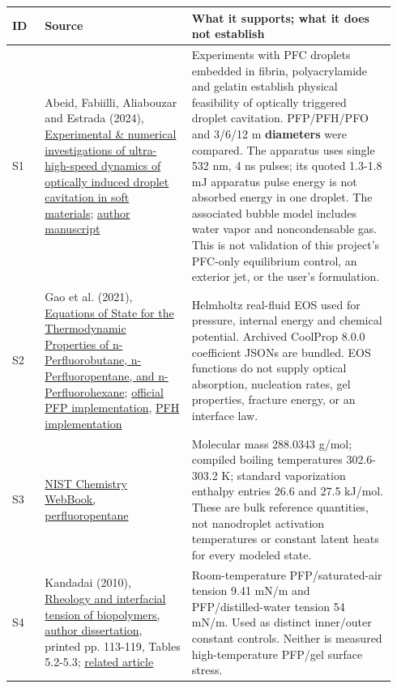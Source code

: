 \documentclass[10pt,a4paper]{article}
\begin{document}
\begin{longtable}{>{\raggedright\arraybackslash}p{0.08\linewidth}>{\raggedright\arraybackslash}p{0.36\linewidth}>{\raggedright\arraybackslash}p{0.5\linewidth}}
\toprule
\textbf{ID} & \textbf{Source} & \textbf{What it supports; what it does not establish}\\\midrule\endhead
S1 & Abeid, Fabiilli, Aliabouzar and Estrada (2024), \href{https://doi.org/10.1016/j.jmbbm.2024.106776}{Experimental \& numerical investigations of ultra-high-speed dynamics of optically induced droplet cavitation in soft materials}; \href{https://pmc.ncbi.nlm.nih.gov/articles/PMC12557251/}{author manuscript} & Experiments with PFC droplets embedded in fibrin, polyacrylamide and gelatin establish physical feasibility of optically triggered droplet cavitation. PFP/PFH/PFO and 3/6/12 \textmu{}m \textbf{diameters} were compared. The apparatus uses single 532 nm, 4 ns pulses; its quoted 1.3-1.8 mJ apparatus pulse energy is not absorbed energy in one droplet. The associated bubble model includes water vapor and noncondensable gas. This is not validation of this project's PFC-only equilibrium control, an exterior jet, or the user's formulation.\\[4pt]
S2 & Gao et al. (2021), \href{https://doi.org/10.1021/acs.iecr.1c02969}{Equations of State for the Thermodynamic Properties of n-Perfluorobutane, n-Perfluoropentane, and n-Perfluorohexane}; \href{https://coolprop.org/fluid_properties/fluids/n-Perfluoropentane.html}{official PFP implementation}, \href{https://coolprop.org/fluid_properties/fluids/n-Perfluorohexane.html}{PFH implementation} & Helmholtz real-fluid EOS used for pressure, internal energy and chemical potential. Archived CoolProp 8.0.0 coefficient JSONs are bundled. EOS functions do not supply optical absorption, nucleation rates, gel properties, fracture energy, or an interface law.\\[4pt]
S3 & \href{https://webbook.nist.gov/cgi/cbook.cgi?ID=C678262&Mask=4}{NIST Chemistry WebBook, perfluoropentane} & Molecular mass 288.0343 g/mol; compiled boiling temperatures 302.6-303.2 K; standard vaporization enthalpy entries 26.6 and 27.5 kJ/mol. These are bulk reference quantities, not nanodroplet activation temperatures or constant latent heats for every modeled state.\\[4pt]
S4 & Kandadai (2010), \href{https://collections.lib.utah.edu/dl_files/40/6e/406e61ce35554485df3ea659a68ff430277482b7.pdf}{Rheology and interfacial tension of biopolymers, author dissertation}, printed pp. 113-119, Tables 5.2-5.3; \href{https://doi.org/10.1021/la100307r}{related article} & Room-temperature PFP/saturated-air tension 9.41 mN/m and PFP/distilled-water tension 54 mN/m. Used as distinct inner/outer constant controls. Neither is measured high-temperature PFP/gel surface stress.\\[4pt]

\end{longtable}
\end{document}
